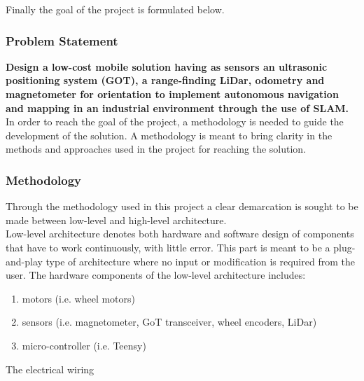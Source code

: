 \noindent Finally the goal of the project is formulated below. \\

\subsubsection{Problem Statement}

\noindent \textbf{Design a low-cost mobile solution having as sensors an ultrasonic positioning system (GOT), a range-finding LiDar, odometry and magnetometer for orientation to implement autonomous navigation and mapping in an industrial environment through the use of SLAM.}\\

\noindent In order to reach the goal of the project, a methodology is needed to guide the development of the solution. A methodology is meant to bring clarity in the methods and approaches used in the project for reaching the solution.

\subsubsection{Methodology}

Through the methodology used in this project a clear demarcation is sought to be made between low-level and high-level architecture.\\

Low-level architecture denotes both hardware and software design of components that have to work continuously, with little error. This part is meant to be a plug-and-play type of architecture where no input or modification is required from the user. The hardware components of the low-level architecture includes:

\begin{enumerate}
    \item motors (i.e. wheel motors)
    \item sensors (i.e. magnetometer, GoT transceiver, wheel encoders, LiDar)
    \item micro-controller (i.e. Teensy)
\end{enumerate}

The electrical wiring

